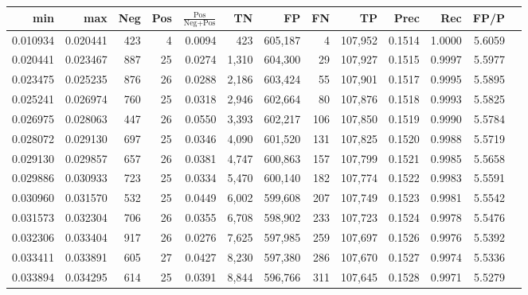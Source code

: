 \begin{tabular}{rrrrrrrrrrrrr}
\toprule
     min &      max & Neg & Pos & $\frac{\text{Pos}}{\text{Neg}+\text{Pos}}$ &      TN &      FP &      FN &      TP &   Prec &    Rec &   FP/P \\
\midrule
0.010934 & 0.020441 & 423 &   4 &                                     0.0094 &     423 & 605,187 &       4 & 107,952 & 0.1514 & 1.0000 & 5.6059 \\
0.020441 & 0.023467 & 887 &  25 &                                     0.0274 &   1,310 & 604,300 &      29 & 107,927 & 0.1515 & 0.9997 & 5.5977 \\
0.023475 & 0.025235 & 876 &  26 &                                     0.0288 &   2,186 & 603,424 &      55 & 107,901 & 0.1517 & 0.9995 & 5.5895 \\
0.025241 & 0.026974 & 760 &  25 &                                     0.0318 &   2,946 & 602,664 &      80 & 107,876 & 0.1518 & 0.9993 & 5.5825 \\
0.026975 & 0.028063 & 447 &  26 &                                     0.0550 &   3,393 & 602,217 &     106 & 107,850 & 0.1519 & 0.9990 & 5.5784 \\
0.028072 & 0.029130 & 697 &  25 &                                     0.0346 &   4,090 & 601,520 &     131 & 107,825 & 0.1520 & 0.9988 & 5.5719 \\
0.029130 & 0.029857 & 657 &  26 &                                     0.0381 &   4,747 & 600,863 &     157 & 107,799 & 0.1521 & 0.9985 & 5.5658 \\
0.029886 & 0.030933 & 723 &  25 &                                     0.0334 &   5,470 & 600,140 &     182 & 107,774 & 0.1522 & 0.9983 & 5.5591 \\
0.030960 & 0.031570 & 532 &  25 &                                     0.0449 &   6,002 & 599,608 &     207 & 107,749 & 0.1523 & 0.9981 & 5.5542 \\
0.031573 & 0.032304 & 706 &  26 &                                     0.0355 &   6,708 & 598,902 &     233 & 107,723 & 0.1524 & 0.9978 & 5.5476 \\
0.032306 & 0.033404 & 917 &  26 &                                     0.0276 &   7,625 & 597,985 &     259 & 107,697 & 0.1526 & 0.9976 & 5.5392 \\
0.033411 & 0.033891 & 605 &  27 &                                     0.0427 &   8,230 & 597,380 &     286 & 107,670 & 0.1527 & 0.9974 & 5.5336 \\
0.033894 & 0.034295 & 614 &  25 &                                     0.0391 &   8,844 & 596,766 &     311 & 107,645 & 0.1528 & 0.9971 & 5.5279 \\

\end{tabular}

